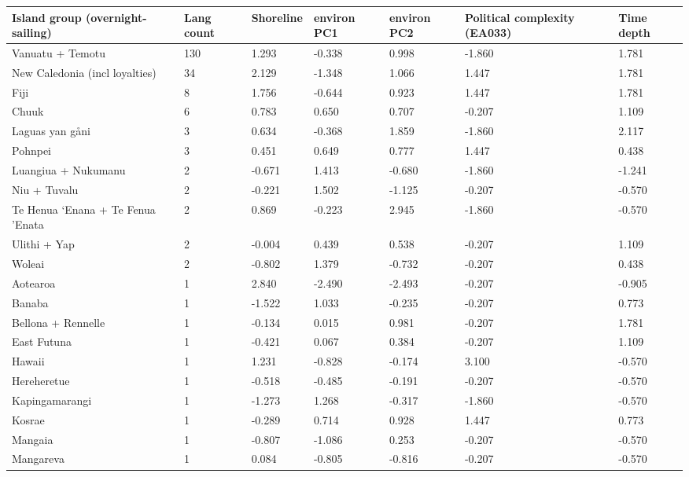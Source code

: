 \begin{longtable}{p{4.5cm}p{1.4cm}p{1.4cm}p{1.4cm}p{1.4cm}p{1.7cm}p{1.7cm}}
  \toprule
Island group (overnight-sailing) & Lang count & Shoreline & environ PC1 & environ PC2 & Political complexity (EA033) & Time depth \\ 
  \midrule
Vanuatu + Temotu & 130 & 1.293 & -0.338 & 0.998 & -1.860 & 1.781 \\ 
  New Caledonia (incl loyalties) & 34 & 2.129 & -1.348 & 1.066 & 1.447 & 1.781 \\ 
  Fiji & 8 & 1.756 & -0.644 & 0.923 & 1.447 & 1.781 \\ 
  Chuuk & 6 & 0.783 & 0.650 & 0.707 & -0.207 & 1.109 \\ 
  Laguas yan gåni & 3 & 0.634 & -0.368 & 1.859 & -1.860 & 2.117 \\ 
  Pohnpei & 3 & 0.451 & 0.649 & 0.777 & 1.447 & 0.438 \\ 
  Luangiua + Nukumanu & 2 & -0.671 & 1.413 & -0.680 & -1.860 & -1.241 \\ 
  Niu + Tuvalu & 2 & -0.221 & 1.502 & -1.125 & -0.207 & -0.570 \\ 
  Te Henua ‘Enana + Te Fenua ’Enata & 2 & 0.869 & -0.223 & 2.945 & -1.860 & -0.570 \\ 
  Ulithi + Yap & 2 & -0.004 & 0.439 & 0.538 & -0.207 & 1.109 \\ 
  Woleai & 2 & -0.802 & 1.379 & -0.732 & -0.207 & 0.438 \\ 
  Aotearoa & 1 & 2.840 & -2.490 & -2.493 & -0.207 & -0.905 \\ 
  Banaba & 1 & -1.522 & 1.033 & -0.235 & -0.207 & 0.773 \\ 
  Bellona + Rennelle & 1 & -0.134 & 0.015 & 0.981 & -0.207 & 1.781 \\ 
  East Futuna & 1 & -0.421 & 0.067 & 0.384 & -0.207 & 1.109 \\ 
  Hawaii & 1 & 1.231 & -0.828 & -0.174 & 3.100 & -0.570 \\ 
  Hereheretue & 1 & -0.518 & -0.485 & -0.191 & -0.207 & -0.570 \\ 
  Kapingamarangi & 1 & -1.273 & 1.268 & -0.317 & -1.860 & -0.570 \\ 
  Kosrae & 1 & -0.289 & 0.714 & 0.928 & 1.447 & 0.773 \\ 
  Mangaia & 1 & -0.807 & -1.086 & 0.253 & -0.207 & -0.570 \\ 
  Mangareva & 1 & 0.084 & -0.805 & -0.816 & -0.207 & -0.570 \\ 

\end{longtable}
